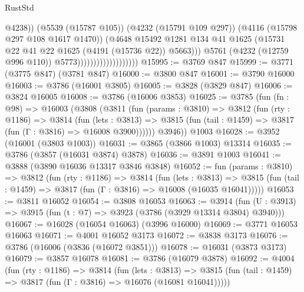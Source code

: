 \begin{lexlean}{RustStd}
\begin{coremodule}
                                                @4238))
                                            (@5539 (@15787 @105))
                                            (@4232 (@15791 @109 @297))
                                            (@4116 (@15798 @297 @108 @1617 @1470))
                                            (@4648
                                              @15492
                                              @1281
                                              @134
                                              @41
                                              @1625
                                              (@15731
                                                @22
                                                @41
                                                @22
                                                @1625
                                                (@4191 (@15736 @22))
                                                @5663)))
                                          @5761
                                          (@4232 (@12759 @996 @110))
                                          @5773)))))))))))))))))))
@15995 := @3769 @847
@15999 := @3771 (@3775 @847) (@3781 @847)
@16000 := @3800 @847
@16001 := @3790 @16000
@16003 := @3786 (@16001 @3805)
@16005 := @3828 (@3829 @847)
@16006 := @3824 @16005
@16008 := @3786 (@16006 @3853)
@16025 := @3785
    (fun (fn : @98) =>
    @16003
      (@3808
        (@3811
          (fun (params : @3810) =>
          @3812
            (fun (rty : @1186) =>
            @3814
              (fun (lets : @3813) =>
              @3815 (fun (tail : @1459) => @3817 (fun (Γ : @3816) => @16008 @3900))))))
        @3946))
    @1003
@16028 := @3952 (@16001 (@3803 @1003))
@16031 := @3865 (@3866 @1003) @13314
@16035 := @3786 (@3857 (@16031 @3874) @3878)
@16036 := @3891 @1003
@16041 := @3888 (@3890 @16036 @13317 @3846 @3848)
@16052 := fun (params : @3810) =>
  @3812
    (fun (rty : @1186) =>
    @3814
      (fun (lets : @3813) =>
      @3815 (fun (tail : @1459) => @3817 (fun (Γ : @3816) => @16008 (@16035 @16041)))))
@16053 := @3811 @16052
@16054 := @3808 @16053
@16063 := @3914
    (fun (U : @3913) => @3915 (fun (t : @7) => @3923 (@3786 (@3929 @13314 @3804) @3940)))
@16067 := @16028 (@16054 @16063) (@3996 @16000)
@16069 := @3771 @16053 @16063
@16071 := @4001 @16052 @3173
@16072 := @3838 @3173
@16076 := @3786 (@16006 (@3836 (@16072 @3851)))
@16078 := @16031 (@3873 @3173)
@16079 := @3857 @16078
@16081 := @3786 (@16079 @3878)
@16092 := @4004
    (fun (rty : @1186) =>
    @3814
      (fun (lets : @3813) =>
      @3815 (fun (tail : @1459) => @3817 (fun (Γ : @3816) => @16076 (@16081 @16041)))))

\end{coremodule}
\end{lexlean}
